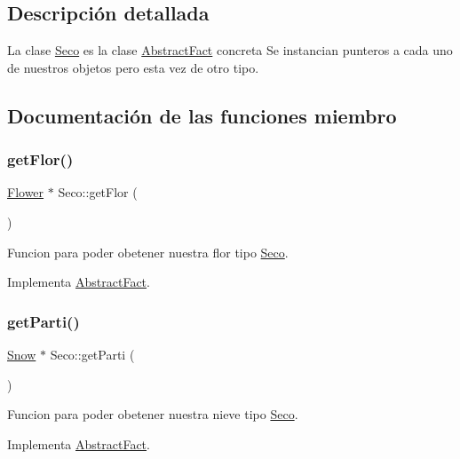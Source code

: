 \subsection{Descripción detallada}
La clase \hyperlink{classSeco}{Seco} es la clase \hyperlink{classAbstractFact}{Abstract\+Fact} concreta  Se instancian punteros a cada uno de nuestros objetos pero esta vez de otro tipo. 

\subsection{Documentación de las funciones miembro}
\mbox{\label{classSeco_a91092401b16231a926255323e89c6412}} 
\subsubsection{\texorpdfstring{get\+Flor()}{getFlor()}}
{\footnotesize\ttfamily \hyperlink{classFlower}{Flower} $\ast$ Seco\+::get\+Flor (\begin{DoxyParamCaption}{ }\end{DoxyParamCaption})\hspace{0.3cm}{\ttfamily [virtual]}}

Funcion para poder obetener nuestra flor tipo \hyperlink{classSeco}{Seco}. 

Implementa \hyperlink{classAbstractFact_a9ee9f34bc189886b24e325ff2412a1d9}{Abstract\+Fact}.

\mbox{\label{classSeco_acd61763141ecdb895062cdde7defa800}} 
\subsubsection{\texorpdfstring{get\+Parti()}{getParti()}}
{\footnotesize\ttfamily \hyperlink{classSnow}{Snow} $\ast$ Seco\+::get\+Parti (\begin{DoxyParamCaption}{ }\end{DoxyParamCaption})\hspace{0.3cm}{\ttfamily [virtual]}}

Funcion para poder obetener nuestra nieve tipo \hyperlink{classSeco}{Seco}. 

Implementa \hyperlink{classAbstractFact_a7b642a7fe5615f7103dd7d1ab4c801d9}{Abstract\+Fact}.

